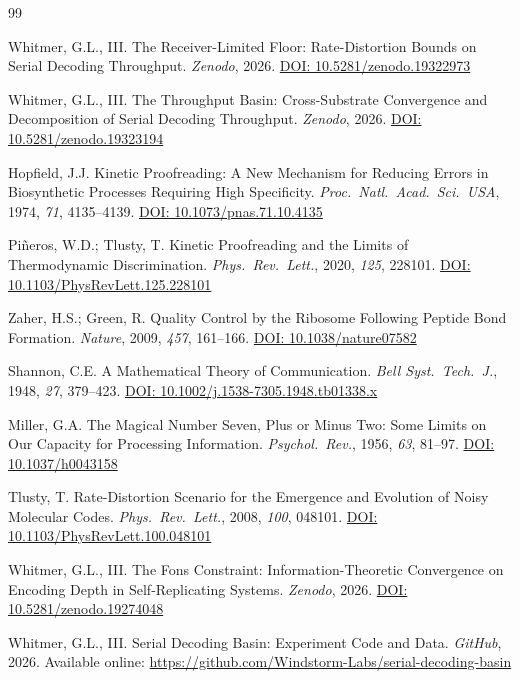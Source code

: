 \documentclass[12pt,a4paper]{article}
\begin{document}
\begin{thebibliography}{99}

Whitmer, G.L., III.
The Receiver-Limited Floor: Rate-Distortion Bounds on Serial Decoding Throughput.
\emph{Zenodo}, 2026.
\href{https://doi.org/10.5281/zenodo.19322973}{DOI: 10.5281/zenodo.19322973}

Whitmer, G.L., III.
The Throughput Basin: Cross-Substrate Convergence and Decomposition of Serial Decoding Throughput.
\emph{Zenodo}, 2026.
\href{https://doi.org/10.5281/zenodo.19323194}{DOI: 10.5281/zenodo.19323194}

Hopfield, J.J.
Kinetic Proofreading: A New Mechanism for Reducing Errors in Biosynthetic Processes Requiring High Specificity.
\emph{Proc.\ Natl.\ Acad.\ Sci.\ USA}, 1974, \emph{71}, 4135--4139.
\href{https://doi.org/10.1073/pnas.71.10.4135}{DOI: 10.1073/pnas.71.10.4135}

Pi\~neros, W.D.; Tlusty, T.
Kinetic Proofreading and the Limits of Thermodynamic Discrimination.
\emph{Phys.\ Rev.\ Lett.}, 2020, \emph{125}, 228101.
\href{https://doi.org/10.1103/PhysRevLett.125.228101}{DOI: 10.1103/PhysRevLett.125.228101}

Zaher, H.S.; Green, R.
Quality Control by the Ribosome Following Peptide Bond Formation.
\emph{Nature}, 2009, \emph{457}, 161--166.
\href{https://doi.org/10.1038/nature07582}{DOI: 10.1038/nature07582}

Shannon, C.E.
A Mathematical Theory of Communication.
\emph{Bell Syst.\ Tech.\ J.}, 1948, \emph{27}, 379--423.
\href{https://doi.org/10.1002/j.1538-7305.1948.tb01338.x}{DOI: 10.1002/j.1538-7305.1948.tb01338.x}

Miller, G.A.
The Magical Number Seven, Plus or Minus Two: Some Limits on Our Capacity for Processing Information.
\emph{Psychol.\ Rev.}, 1956, \emph{63}, 81--97.
\href{https://doi.org/10.1037/h0043158}{DOI: 10.1037/h0043158}

Tlusty, T.
Rate-Distortion Scenario for the Emergence and Evolution of Noisy Molecular Codes.
\emph{Phys.\ Rev.\ Lett.}, 2008, \emph{100}, 048101.
\href{https://doi.org/10.1103/PhysRevLett.100.048101}{DOI: 10.1103/PhysRevLett.100.048101}

Whitmer, G.L., III.
The Fons Constraint: Information-Theoretic Convergence on Encoding Depth in Self-Replicating Systems.
\emph{Zenodo}, 2026.
\href{https://doi.org/10.5281/zenodo.19274048}{DOI: 10.5281/zenodo.19274048}

Whitmer, G.L., III.
Serial Decoding Basin: Experiment Code and Data.
\emph{GitHub}, 2026.
Available online: \url{https://github.com/Windstorm-Labs/serial-decoding-basin}

\end{thebibliography}
\end{document}
